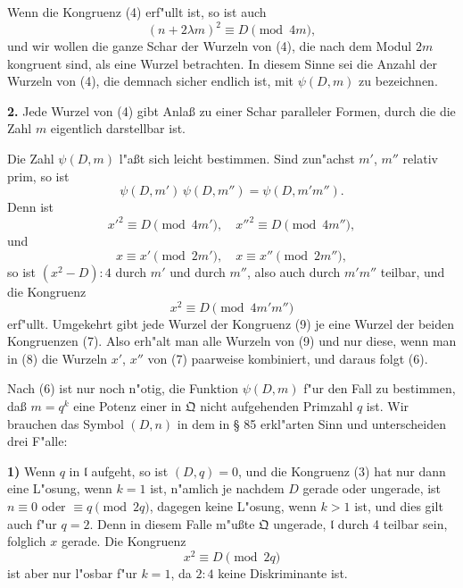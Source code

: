 \documentclass[12pt,a4paper]{article}
\theoremstyle{plain}
\begin{document}
Wenn die Kongruenz (4) erf"ullt ist, so ist auch
\[
(n + 2\lambda m)^2 \equiv D \pmod{4m},
\]
und wir wollen die ganze Schar der Wurzeln von (4), die nach dem Modul $2m$ kongruent sind, als eine Wurzel betrachten. In diesem Sinne sei die Anzahl der Wurzeln von (4), die demnach sicher endlich ist, mit $\psi(D, m)$ zu bezeichnen.

\textbf{2.} Jede Wurzel von (4) gibt Anla\ss{} zu einer Schar paralleler Formen, durch die die Zahl $m$ eigentlich darstellbar ist.

Die Zahl $\psi(D, m)$ l"a\ss t sich leicht bestimmen. Sind zun"achst $m'$, $m''$ relativ prim, so ist
\begin{equation}
\psi(D, m')\,\psi(D, m'') = \psi(D, m'm'').
\tag{6}
\end{equation}
Denn ist
\begin{equation}
x'^2 \equiv D \pmod{4m'},\quad x''^2 \equiv D \pmod{4m''},
\tag{7}
\end{equation}
und
\begin{equation}
x \equiv x' \pmod{2m'},\quad x \equiv x'' \pmod{2m''},
\tag{8}
\end{equation}
so ist $(x^2 - D):4$ durch $m'$ und durch $m''$, also auch durch $m'm''$ teilbar, und die Kongruenz
\begin{equation}
x^2 \equiv D \pmod{4m'm''}
\tag{9}
\end{equation}
erf"ullt. Umgekehrt gibt jede Wurzel der Kongruenz (9) je eine Wurzel der beiden Kongruenzen (7). Also erh"alt man alle Wurzeln von (9) und nur diese, wenn man in (8) die Wurzeln $x'$, $x''$ von (7) paarweise kombiniert, und daraus folgt (6).

Nach (6) ist nur noch n"otig, die Funktion $\psi(D, m)$ f"ur den Fall zu bestimmen, da\ss{} $m = q^k$ eine Potenz einer in $\mathfrak{Q}$ nicht aufgehenden Primzahl $q$ ist. Wir brauchen das Symbol $(D, n)$ in dem in \S{} 85 erkl"arten Sinn und unterscheiden drei F"alle:

\textbf{1)} Wenn $q$ in $\mathfrak{l}$ aufgeht, so ist $(D, q) = 0$, und die Kongruenz (3) hat nur dann eine L"osung, wenn $k = 1$ ist, n"amlich je nachdem $D$ gerade oder ungerade, ist $n \equiv 0$ oder $\equiv q \pmod{2q}$, dagegen keine L"osung, wenn $k > 1$ ist, und dies gilt auch f"ur $q = 2$. Denn in diesem Falle m"u\ss te $\mathfrak{Q}$ ungerade, $\mathfrak{l}$ durch 4 teilbar sein, folglich $x$ gerade. Die Kongruenz
\begin{equation}
x^2 \equiv D \pmod{2q}
\tag{10}
\end{equation}
ist aber nur l"osbar f"ur $k = 1$, da $2:4$ keine Diskriminante ist.
\end{document}
